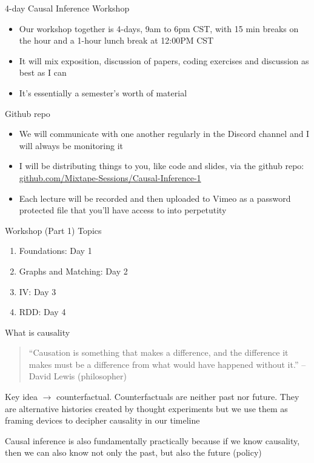 \documentclass{beamer}
\begin{document}
\begin{frame}{4-day Causal Inference Workshop}

  \begin{itemize}
    \item Our workshop together is 4-days, 9am to 6pm CST, with 15 min breaks on the hour and a 1-hour lunch break at 12:00PM CST
    \item It will mix exposition, discussion of papers, coding exercises and discussion as best as I can
    \item It's essentially a semester's worth of material
  \end{itemize}

\end{frame}

\begin{frame}{Github repo}

  \begin{itemize}
    \item We will communicate with one another regularly in the Discord channel and I will always be monitoring it
    \item I will be distributing things to you, like code and slides, via the github repo: \url{github.com/Mixtape-Sessions/Causal-Inference-1}
    \item Each lecture will be recorded and then uploaded to Vimeo as a password protected file that you'll have access to into perpetutity
  \end{itemize}

\end{frame}

\begin{frame}{Workshop (Part 1) Topics}

  \begin{enumerate}
    \item Foundations: Day 1
    \item Graphs and Matching: Day 2
    \item IV: Day 3
    \item RDD: Day 4
  \end{enumerate}

\end{frame}

\begin{frame}{What is causality}

  \begin{quote}
    ``Causation is something that makes a difference, and the difference it makes must be a difference from what would have happened without it.'' -- David Lewis (philosopher)
  \end{quote}

  \bigskip
  Key idea $\rightarrow$ counterfactual. Counterfactuals are neither past nor future.  They are alternative histories created by thought experiments but we use them as framing devices to decipher causality in our timeline

  \bigskip

  Causal inference is also fundamentally practically because if we know causality, then we can also know not only the past, but also the future (policy)

\end{frame}
\end{document}
